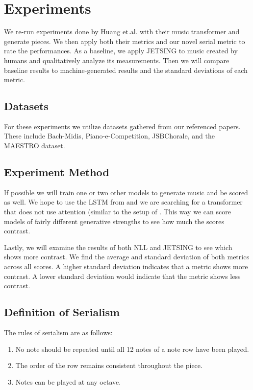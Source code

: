 \documentclass[11pt]{article}
\begin{document}
\section{Experiments}
We re-run experiments done by Huang et.al. with their music transformer and generate pieces.
We then apply both their metrics and our novel serial metric to rate the performances.
As a baseline, we apply JETSING to music created by humans and qualitatively analyze its measurements.
Then we will compare baseline results to machine-generated results and the standard deviations of each metric.

\subsection{Datasets}
For these experiments we utilize datasets gathered from our referenced papers.
These include Bach-Midis, Piano-e-Competition, JSBChorale, and the MAESTRO dataset.

\subsection{Experiment Method}
If possible we will train one or two other models to generate music and be scored as well.
We hope to use the LSTM from \citep{kotecha2018generating} and we are searching for a transformer that does not use attention (similar to the setup of \cite{huang2018music}.
This way we can score models of fairly different generative strengths to see how much the scores contrast.

Lastly, we will examine the results of both NLL and JETSING to see which shows more contrast.
We find the average and standard deviation of both metrics across all scores.
A higher standard deviation indicates that a metric shows more contrast.
A lower standard deviation would indicate that the metric shows less contrast.

\subsection{Definition of Serialism}
The rules of serialism are as follows:
\begin{enumerate}
    \item No note should be repeated until all 12 notes of a note row have been played.
    \item The order of the row remains consistent throughout the piece.
    \item Notes can be played at any octave.
\end{enumerate}
\end{document}
